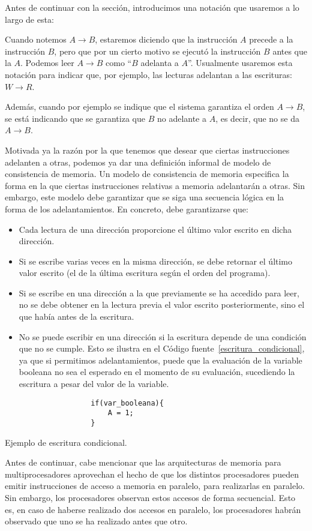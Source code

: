 Antes de continuar con la sección, introducimos una notación que usaremos a lo largo de esta:
\begin{notacion}
    Cuando notemos $A\rightarrow B$, estaremos diciendo que la instrucción $A$ precede a la instrucción $B$, pero que por un cierto motivo se ejecutó la instrucción $B$ antes que la $A$. Podemos leer $A\rightarrow B$ como ``$B$ adelanta a $A$''.
    Usualmente usaremos esta notación para indicar que, por ejemplo, las lecturas adelantan a las escrituras: $W \rightarrow R$.

    Además, cuando por ejemplo se indique que el sistema garantiza el orden $A\rightarrow B$, se está indicando que se garantiza que $B$ no adelante a $A$, es decir, que no se da $A\rightarrow B$.
\end{notacion}
Motivada ya la razón por la que tenemos que desear que ciertas instrucciones adelanten a otras, podemos ya dar una definición informal de modelo de consistencia de memoria. Un modelo de consistencia de memoria especifica la forma en la que ciertas instrucciones relativas a memoria adelantarán a otras. Sin embargo, este modelo debe garantizar que se siga una secuencia lógica en la forma de los adelantamientos. En concreto, debe garantizarse que:
\begin{itemize}
    \item Cada lectura de una dirección proporcione el último valor escrito en dicha dirección.
    \item Si se escribe varias veces en la misma dirección, se debe retornar el último valor escrito (el de la última escritura según el orden del programa).
    \item Si se escribe en una dirección a la que previamente se ha accedido para leer, no se debe obtener en la lectura previa el valor escrito posteriormente, sino el que había antes de la escritura.
    \item No se puede escribir en una dirección si la escritura depende de una condición que no se cumple. Esto se ilustra en el Código fuente~\ref{escritura_condicional}, ya que si permitimos adelantamientos, puede que la evaluación de la variable booleana no sea el esperado en el momento de su evaluación, sucediendo la escritura a pesar del valor de la variable.
\end{itemize}

\begin{listing}[H]
\centering
\begin{verbatim}
                    if(var_booleana){
                        A = 1;
                    }
\end{verbatim}
\caption{Ejemplo de escritura condicional.}
\label{escritura_condicional}
\end{listing}
Antes de continuar, cabe mencionar que las arquitecturas de memoria para multiprocesadores aprovechan el hecho de que los distintos procesadores pueden emitir instrucciones de acceso a memoria en paralelo, para realizarlas en paralelo. Sin embargo, los procesadores observan estos accesos de forma secuencial. Esto es, en caso de haberse realizado dos accesos en paralelo, los procesadores habrán observado que uno se ha realizado antes que otro.

